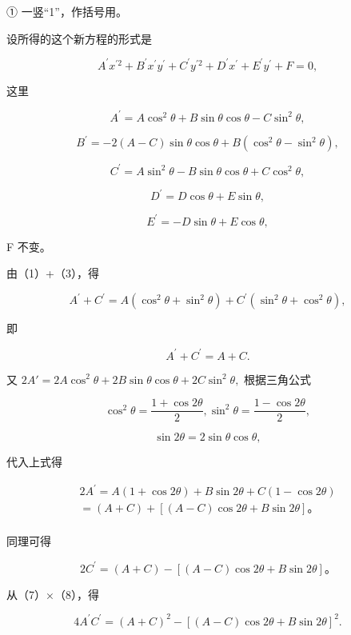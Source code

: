 ① 一竖``1''，作括号用。

设所得的这个新方程的形式是

\[
A^{\prime} x^{\prime 2} + B^{\prime} x^{\prime} y^{\prime} + C^{\prime} y^{\prime 2} + D^{\prime} x^{\prime} + E^{\prime} y^{\prime} + F = 0,
\]

这里

\[
A^{\prime} = A \cos^{2} \theta + B \sin \theta \cos \theta - C \sin^{2} \theta, \tag {1}
\]

\[
B^{\prime} = - 2 (A - C) \sin \theta \cos \theta + B (\cos^{2} \theta - \sin^{2} \theta), \tag {2}
\]

\[
C^{\prime} = A \sin^{2} \theta - B \sin \theta \cos \theta + C \cos^{2} \theta, \tag {3}
\]

\[
D^{\prime} = D \cos \theta + E \sin \theta, \tag {4}
\]

\[
E^{\prime} = - D \sin \theta + E \cos \theta, \tag {5}
\]

F 不变。

由（1）+（3），得

\[
A^{\prime} + C^{\prime} = A \left(\cos^{2} \theta + \sin^{2} \theta\right) + C^{\prime} \left(\sin^{2} \theta + \cos^{2} \theta\right),
\]

即

\[
A^{\prime} + C^{\prime} = A + C. \tag {6}
\]

又
\(2A' = 2A\cos^2\theta + 2B\sin \theta \cos \theta + 2C\sin^2\theta,\)
根据三角公式

\[
\cos^{2} \theta = \frac {1 + \cos 2 \theta}{2}, \sin^{2} \theta = \frac {1 - \cos 2 \theta}{2},
\]

\[
\sin 2 \theta = 2 \sin \theta \cos \theta,
\]

代入上式得

\[
\begin{array}{l} 2 A^{\prime} = A (1 + \cos 2 \theta) + B \sin 2 \theta + C (1 - \cos 2 \theta) \\ = (A + C) + [ (A - C) \cos 2 \theta + B \sin 2 \theta ]\text{。} \tag {7} \\ \end{array}
\]

同理可得

\[
2 C^{\prime} = (A + C) - [ (A - C) \cos 2 \theta + B \sin 2 \theta ]\text{。} \tag {8}
\]

从（7）×（8），得

\[
4 A^{\prime} C^{\prime} = (A + C) ^ {2} - [ (A - C) \cos 2 \theta + B \sin 2 \theta ] ^ {2}. \tag {9}
\]

